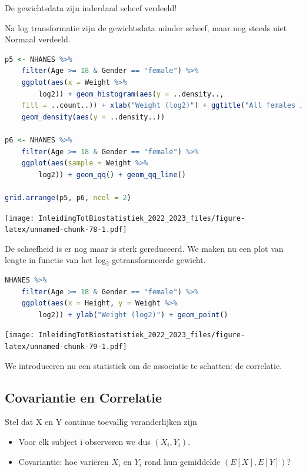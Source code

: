 \documentclass[
  12pt,dutch,coursenotes]{book}
\providecommand{\tightlist}{%
  \setlength{\itemsep}{0pt}\setlength{\parskip}{0pt}}
\begin{document}
De gewichtsdata zijn inderdaad scheef verdeeld!

Na log transformatie zijn de gewichtsdata minder scheef, maar nog steeds niet Normaal verdeeld.

\begin{lstlisting}[language=R]
p5 <- NHANES %>%
    filter(Age >= 18 & Gender == "female") %>%
    ggplot(aes(x = Weight %>%
        log2)) + geom_histogram(aes(y = ..density..,
    fill = ..count..)) + xlab("Weight (log2)") + ggtitle("All females in study") +
    geom_density(aes(y = ..density..))

p6 <- NHANES %>%
    filter(Age >= 18 & Gender == "female") %>%
    ggplot(aes(sample = Weight %>%
        log2)) + geom_qq() + geom_qq_line()

grid.arrange(p5, p6, ncol = 2)
\end{lstlisting}

\texttt{[image: InleidingTotBiostatistiek\_2022\_2023\_files/figure-latex/unnamed-chunk-78-1.pdf]}

De scheefheid is er nog maar is sterk gereduceerd. We maken nu een plot van lengte in functie van het log\(_2\) getransformeerde gewicht.

\begin{lstlisting}[language=R]
NHANES %>%
    filter(Age >= 18 & Gender == "female") %>%
    ggplot(aes(x = Height, y = Weight %>%
        log2)) + ylab("Weight (log2)") + geom_point()
\end{lstlisting}

\texttt{[image: InleidingTotBiostatistiek\_2022\_2023\_files/figure-latex/unnamed-chunk-79-1.pdf]}

We introduceren nu een statistiek om de associatie te schatten: de correlatie.

\hypertarget{covariantie-en-correlatie}{%
\subsection{Covariantie en Correlatie}\label{covariantie-en-correlatie}}

Stel dat X en Y continue toevallig veranderlijken zijn

\begin{itemize}
\tightlist
\item
  Voor elk subject i observeren we dus \((X_i,Y_i)\).
\item
  Covariantie: hoe variëren \(X_i\) en \(Y_i\) rond hun gemiddelde \((E[X],E[Y])\)?
\end{itemize}
\end{document}
